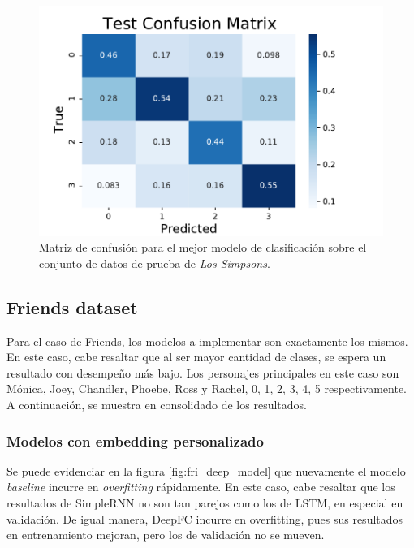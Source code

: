 \begin{figure}[H]
    \centering
    \includegraphics{doc/images/simpsons_test_confusion.pdf}
    \caption{Matriz de confusión para el mejor modelo de clasificación sobre el conjunto de datos de prueba de \textit{Los Simpsons}.}
    \label{fig:em_simpsons_confusion_test}
\end{figure}


\subsection{Friends dataset}
Para el caso de Friends, los modelos a implementar son exactamente los mismos. En este caso, cabe resaltar que al ser mayor cantidad de clases, se espera un resultado con desempeño más bajo. Los personajes principales en este caso son Mónica, Joey, Chandler, Phoebe, Ross y Rachel, 0, 1, 2, 3, 4, 5 respectivamente. A continuación, se muestra en consolidado de los resultados.\\

\subsubsection{Modelos con embedding personalizado}

Se puede evidenciar en la figura \ref{fig:fri_deep_model} que nuevamente el modelo \textit{baseline} incurre en \textit{overfitting} rápidamente. En este caso, cabe resaltar que los resultados de SimpleRNN no son tan parejos como los de LSTM, en especial en validación. De igual manera, DeepFC incurre en overfitting, pues sus resultados en entrenamiento mejoran, pero los de validación no se mueven.\\

